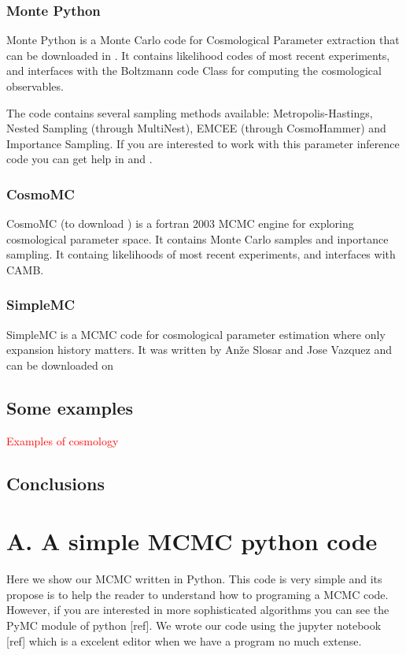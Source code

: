 \documentclass[onecolumn,           %
               showpacs,            %
               preprintnumbers,     %
               aps,                 %
               prl,          	    %
               letterpaper,             %
               superscriptaddress,      %
               nofootinbib,         %
               tightenlines,        %
               floats,floatfix      %
               ,usenatbib,
               ]{revtex4-1}
\begin{document}
\subsubsection{Monte Python}

Monte Python is a Monte Carlo code for Cosmological Parameter extraction  that can be downloaded in \cite{MP1}. It contains likelihood codes of most recent experiments, and interfaces with the Boltzmann code Class for computing the cosmological observables.

The code contains several sampling methods available: Metropolis-Hastings, Nested Sampling (through MultiNest), EMCEE (through CosmoHammer) and Importance Sampling. If you are interested to work with this parameter inference code you can get help in \cite{mont1} and \cite{MP2}.

\subsubsection{CosmoMC}

CosmoMC (to download \cite{cosmomc}) is a fortran 2003 MCMC engine for exploring cosmological parameter space. It contains Monte Carlo samples and inportance sampling. It containg likelihoods of most recent experiments, and interfaces with CAMB.

\subsubsection{SimpleMC}

SimpleMC is a MCMC code for cosmological parameter estimation where only expansion history matters. It was written by Anže Slosar and Jose Vazquez and can be downloaded on \cite{simplemc}

\subsection{Some examples}
\textcolor{red}{Examples of cosmology}
\subsection{Conclusions}
\appendix
\section{A. A simple MCMC python code}

Here we show our MCMC written in Python. This code is very simple and its propose is to help the reader to understand how to programing a MCMC code. However, if you are interested in more sophisticated algorithms you can see the PyMC module of python [ref]. We wrote our code using the jupyter notebook [ref] which is a excelent editor when we have a program no much extense.  
\end{document}
